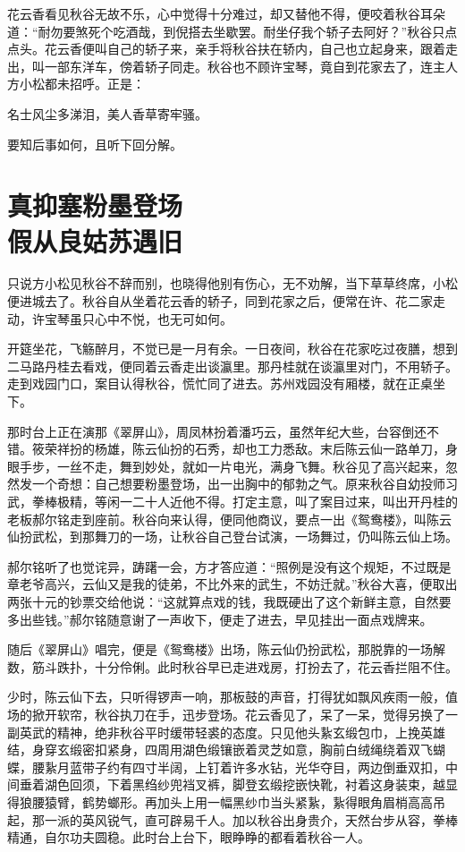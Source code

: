 \documentclass[12pt,UTF8]{ctexbook}
\begin{document}
花云香看见秋谷无故不乐，心中觉得十分难过，却又替他不得，便咬着秋谷耳朵道：“耐勿要煞死个吃酒哉，到倪搭去坐歇罢。耐坐仔我个轿子去阿好？”秋谷只点点头。花云香便叫自己的轿子来，亲手将秋谷扶在轿内，自己也立起身来，跟着走出，叫一部东洋车，傍着轿子同走。秋谷也不顾许宝琴，竟自到花家去了，连主人方小松都未招呼。正是：

名士风尘多涕泪，美人香草寄牢骚。

要知后事如何，且听下回分解。

\chapter[真抑塞粉墨登场\ 假从良姑苏遇旧]{真抑塞粉墨登场\\假从良姑苏遇旧}

只说方小松见秋谷不辞而别，也晓得他别有伤心，无不劝解，当下草草终席，小松便进城去了。秋谷自从坐着花云香的轿子，同到花家之后，便常在许、花二家走动，许宝琴虽只心中不悦，也无可如何。

开筵坐花，飞觞醉月，不觉已是一月有余。一日夜间，秋谷在花家吃过夜膳，想到二马路丹桂去看戏，便同着云香走出谈瀛里。那丹桂就在谈瀛里对门，不用轿子。走到戏园门口，案目认得秋谷，慌忙同了进去。苏州戏园没有厢楼，就在正桌坐下。

那时台上正在演那《翠屏山》，周凤林扮着潘巧云，虽然年纪大些，台容倒还不错。筱荣祥扮的杨雄，陈云仙扮的石秀，却也工力悉敌。末后陈云仙一路单刀，身眼手步，一丝不走，舞到妙处，就如一片电光，满身飞舞。秋谷见了高兴起来，忽然发一个奇想：自己想要粉墨登场，出一出胸中的郁勃之气。原来秋谷自幼投师习武，拳棒极精，等闲一二十人近他不得。打定主意，叫了案目过来，叫出开丹桂的老板郝尔铭走到座前。秋谷向来认得，便同他商议，要点一出《鸳鸯楼》，叫陈云仙扮武松，到那舞刀的一场，让秋谷自己登台试演，一场舞过，仍叫陈云仙上场。

郝尔铭听了也觉诧异，踌躇一会，方才答应道：“照例是没有这个规矩，不过既是章老爷高兴，云仙又是我的徒弟，不比外来的武生，不妨迁就。”秋谷大喜，便取出两张十元的钞票交给他说：“这就算点戏的钱，我既硬出了这个新鲜主意，自然要多出些钱。”郝尔铭随意谢了一声收下，便走了进去，早见挂出一面点戏牌来。

随后《翠屏山》唱完，便是《鸳鸯楼》出场，陈云仙仍扮武松，那脱靠的一场解数，筋斗跌扑，十分伶俐。此时秋谷早已走进戏房，打扮去了，花云香拦阻不住。

少时，陈云仙下去，只听得锣声一响，那板鼓的声音，打得犹如飘风疾雨一般，值场的掀开软帘，秋谷执刀在手，迅步登场。花云香见了，呆了一呆，觉得另换了一副英武的精神，绝非秋谷平时缓带轻裘的态度。只见他头紥玄缎包巾，上挽英雄结，身穿玄缎密扣紧身，四周用湖色缎镶嵌着灵芝如意，胸前白绒绳绕着双飞蝴蝶，腰紥月蓝带子约有四寸半阔，上钉着许多水钻，光华夺目，两边倒垂双扣，中间垂着湖色回须，下着黑绉纱兜裆叉裤，脚登玄缎挖嵌快靴，衬着这身装束，越显得狼腰猿臂，鹤势螂形。再加头上用一幅黑纱巾当头紧紥，紥得眼角眉梢高高吊起，那一派的英风锐气，直可辟易千人。加以秋谷出身贵介，天然台步从容，拳棒精通，自尔功夫圆稳。此时台上台下，眼睁睁的都看着秋谷一人。
\end{document}
